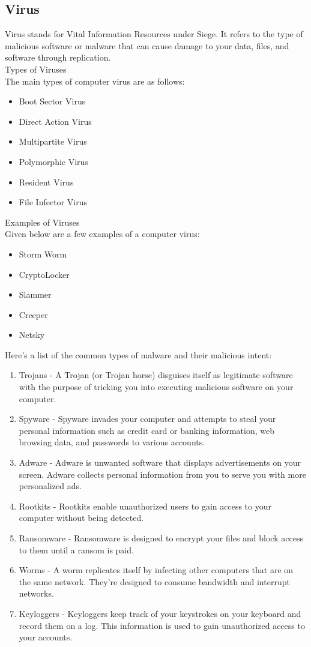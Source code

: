 \documentclass[11pt,a4paper,twoside]{article}
\begin{document}
\subsection{Virus}
Virus stands for Vital Information Resources under Siege. It refers to the type of malicious software or malware that can cause damage to your data, files, and software through replication.\\
Types of Viruses\\
The main types of computer virus are as follows:
\begin{itemize}
\item Boot Sector Virus
\item Direct Action Virus
\item Multipartite Virus
\item Polymorphic Virus
\item Resident Virus
\item File Infector Virus
\end{itemize}
Examples of Viruses\\
Given below are a few examples of a computer virus:
\begin{itemize}
\item Storm Worm
\item CryptoLocker
\item Slammer
\item Creeper
\item Netsky
\end{itemize}
Here’s a list of the common types of malware and their malicious intent:\\
\begin{enumerate}
\item Trojans - A Trojan (or Trojan horse) disguises itself as legitimate software with the purpose of tricking you into executing malicious software on your computer.
\item Spyware - Spyware invades your computer and attempts to steal your personal information such as credit card or banking information, web browsing data, and passwords to various accounts.
\item Adware - Adware is unwanted software that displays advertisements on your screen. Adware collects personal information from you to serve you with more personalized ads.
\item Rootkits - Rootkits enable unauthorized users to gain access to your computer without being detected.
\item Ransomware - Ransomware is designed to encrypt your files and block access to them until a ransom is paid.
\item Worms - A worm replicates itself by infecting other computers that are on the same network. They’re designed to consume bandwidth and interrupt networks.
\item Keyloggers - Keyloggers keep track of your keystrokes on your keyboard and record them on a log. This information is used to gain unauthorized access to your accounts.
\end{enumerate}
\end{document}
